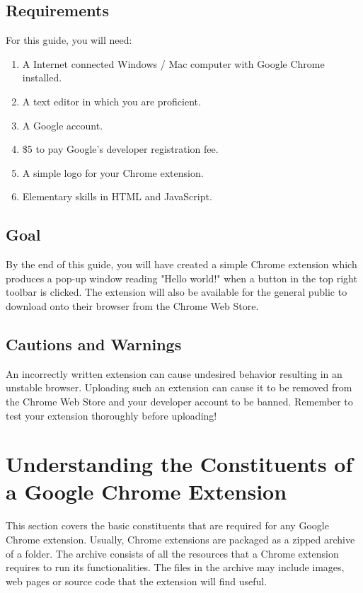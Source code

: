\documentclass[11pt]{article}
\begin{document}
\subsection{Requirements}

For this guide, you will need:

\begin{enumerate}
	\item A Internet connected Windows / Mac computer with Google Chrome installed.
	\item A text editor in which you are proficient.
	\item A Google account.
	\item \$5 to pay Google's developer registration fee.
	\item A simple logo for your Chrome extension.
	\item Elementary skills in HTML and JavaScript.
\end{enumerate}

\subsection{Goal}

By the end of this guide, you will have created a simple Chrome extension which produces a pop-up window reading "Hello world!" when a button in the top right toolbar is clicked. The extension will also be available for the general public to download onto their browser from the Chrome Web Store.

\subsection{Cautions and Warnings}

An incorrectly written extension can cause undesired behavior resulting in an unstable browser. Uploading such an extension can cause it to be removed from the Chrome Web Store and your developer account to be banned. Remember to test your extension thoroughly before uploading!

\newpage

\section{Understanding the Constituents of a Google Chrome Extension}

This section covers the basic constituents that are required for any Google Chrome extension. Usually, Chrome extensions are packaged as a zipped archive of a folder. The archive consists of all the resources that a Chrome extension requires to run its functionalities. The files in the archive may include images, web pages or source code that the extension will find useful.
\end{document}
